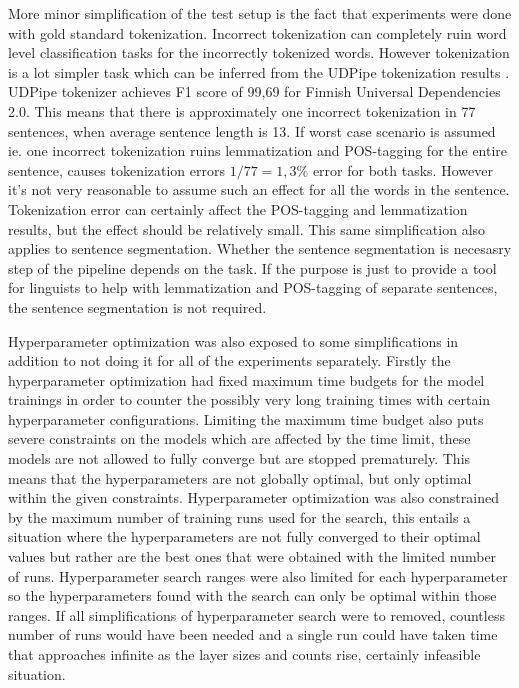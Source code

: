 \documentclass[12pt,a4paper,english
]{tutthesis}
\begin{document}
More minor simplification of the test setup is the fact that experiments were done with gold standard tokenization. Incorrect tokenization can completely ruin word level classification tasks for the incorrectly tokenized words. However tokenization is a lot simpler task which can be inferred from the UDPipe tokenization results \cite{Straka2017}. UDPipe tokenizer achieves F1 score of 99,69 for Finnish Universal Dependencies 2.0. This means that there is approximately one incorrect tokenization in 77 sentences, when average sentence length is 13. If worst case scenario is assumed ie. one incorrect tokenization ruins lemmatization and POS-tagging for the entire sentence, causes tokenization errors $1/77 = 1,3\%$ error for both tasks. However it's not very reasonable to assume such an effect for all the words in the sentence. Tokenization error can certainly affect the POS-tagging and lemmatization results, but the effect should be relatively small. This same simplification also applies to sentence segmentation. Whether the sentence segmentation is necesasry step of the pipeline depends on the task. If the purpose is just to provide a tool for linguists to help with lemmatization and POS-tagging of separate sentences, the sentence segmentation is not required.

Hyperparameter optimization was also exposed to some simplifications in addition to not doing it for all of the experiments separately. Firstly the hyperparameter optimization had fixed maximum time budgets for the model trainings in order to counter the possibly very long training times with certain hyperparameter configurations. Limiting the maximum time budget also puts severe constraints on the models which are affected by the time limit, these models are not allowed to fully converge but are stopped prematurely. This means that the hyperparameters are not globally optimal, but only optimal within the given constraints. Hyperparameter optimization was also constrained by the maximum number of training runs used for the search, this entails a situation where the hyperparameters are not fully converged to their optimal values but rather are the best ones that were obtained with the limited number of runs. Hyperparameter search ranges were also limited for each hyperparameter so the hyperparameters found with the search can only be optimal within those ranges. If all simplifications of hyperparameter search were to removed, countless number of runs would have been needed and a single run could have taken time that approaches infinite as the layer sizes and counts rise, certainly infeasible situation.
\end{document}

